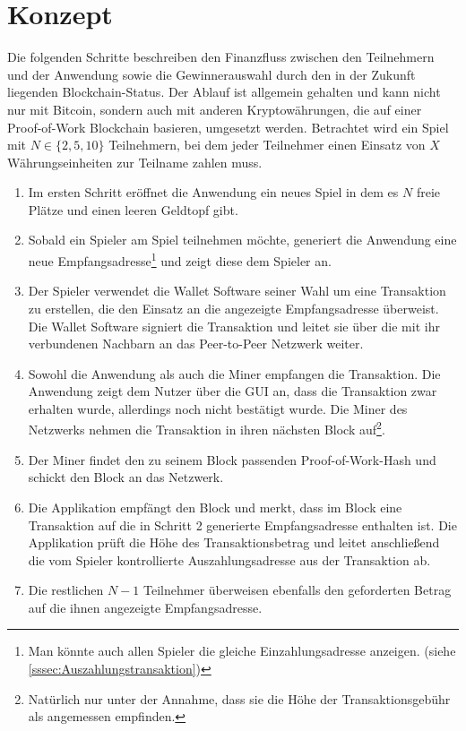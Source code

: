 \section{Konzept}

Die folgenden Schritte beschreiben den Finanzfluss zwischen den Teilnehmern und der Anwendung sowie die Gewinnerauswahl durch den in der Zukunft liegenden Blockchain-Status. Der Ablauf ist allgemein gehalten und kann nicht nur mit Bitcoin, sondern auch mit anderen Kryptowährungen, die auf einer Proof-of-Work Blockchain basieren, umgesetzt werden. Betrachtet wird ein Spiel mit $N \in \{2,5,10\}$ Teilnehmern, bei dem jeder Teilnehmer einen Einsatz von $X$ Währungseinheiten zur Teilname zahlen muss. 

\begin{enumerate}
\item Im ersten Schritt eröffnet die Anwendung ein neues Spiel in dem es $N$ freie Plätze und einen leeren Geldtopf gibt.
\item Sobald ein Spieler am Spiel teilnehmen möchte, generiert die Anwendung eine neue Empfangsadresse\footnote{Man könnte auch allen Spieler die gleiche Einzahlungsadresse anzeigen. (siehe \ref{sssec:Auszahlungstransaktion})} und zeigt diese dem Spieler an.
\item Der Spieler verwendet die Wallet Software seiner Wahl um eine Transaktion zu erstellen, die den Einsatz an die angezeigte Empfangsadresse überweist. Die Wallet Software signiert die Transaktion und leitet sie über die mit ihr verbundenen Nachbarn an das Peer-to-Peer Netzwerk weiter.
\item Sowohl die Anwendung als auch die Miner empfangen die Transaktion. Die Anwendung zeigt dem Nutzer über die GUI an, dass die Transaktion zwar erhalten wurde, allerdings noch nicht bestätigt wurde. Die Miner des Netzwerks nehmen die Transaktion in ihren nächsten Block auf\footnote{Natürlich nur unter der Annahme, dass sie die Höhe der Transaktionsgebühr als angemessen empfinden.}.
\item Der Miner findet den zu seinem Block passenden Proof-of-Work-Hash und schickt den Block an das Netzwerk.
\item Die Applikation empfängt den Block und merkt, dass im Block eine Transaktion auf die in Schritt 2 generierte Empfangsadresse enthalten ist. Die Applikation prüft die Höhe des Transaktionsbetrag und leitet anschließend die vom Spieler kontrollierte Auszahlungsadresse aus der Transaktion ab. 
\item  Die restlichen $N-1$ Teilnehmer überweisen ebenfalls den geforderten Betrag auf die ihnen angezeigte Empfangsadresse.

\end{enumerate}
